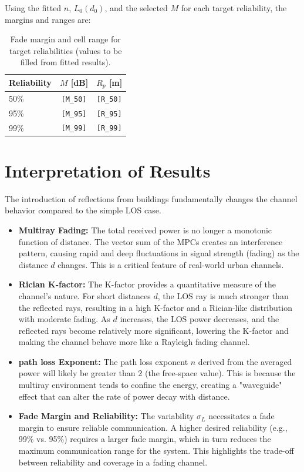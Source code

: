
\noindent Using the fitted $n$, $L_0(d_0)$, and the selected $M$ for each target reliability, the margins and ranges are:
\begin{table}[h]
	\centering
	\caption{Fade margin and cell range for target reliabilities (values to be filled from fitted results).}
	\vspace{0.3em}
	\begin{tabular}{lcc}
		\hline
		Reliability & $M$ [dB] & $R_p$ [m] \\
		\hline
		50\% & \texttt{[M\_50]} & \texttt{[R\_50]} \\
		95\% & \texttt{[M\_95]} & \texttt{[R\_95]} \\
		99\% & \texttt{[M\_99]} & \texttt{[R\_99]} \\
		\hline
	\end{tabular}
\end{table}


\section{Interpretation of Results}
The introduction of reflections from buildings fundamentally changes the channel behavior compared to the simple LOS case.
\begin{itemize}
	\item \textbf{Multiray Fading:} The total received power is no longer a monotonic function of distance. The vector sum of the MPCs creates an interference pattern, causing rapid and deep fluctuations in signal strength (fading) as the distance $d$ changes. This is a critical feature of real-world urban channels.
	\item \textbf{Rician K-factor:} The K-factor provides a quantitative measure of the channel's nature. For short distances $d$, the LOS ray is much stronger than the reflected rays, resulting in a high K-factor and a Rician-like distribution with moderate fading. As $d$ increases, the LOS power decreases, and the reflected rays become relatively more significant, lowering the K-factor and making the channel behave more like a Rayleigh fading channel.
	\item \textbf{path loss Exponent:} The path loss exponent $n$ derived from the averaged power will likely be greater than 2 (the free-space value). This is because the multiray environment tends to confine the energy, creating a "waveguide" effect that can alter the rate of power decay with distance.
	\item \textbf{Fade Margin and Reliability:} The variability $\sigma_L$ necessitates a fade margin to ensure reliable communication. A higher desired reliability (e.g., 99\% vs. 95\%) requires a larger fade margin, which in turn reduces the maximum communication range for the system. This highlights the trade-off between reliability and coverage in a fading channel.
\end{itemize}


